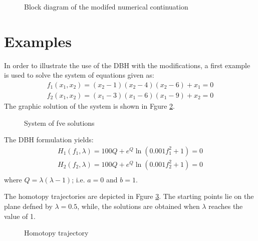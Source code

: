 \documentclass[conference]{IEEEtran}
\begin{document}
\begin{figure}[hbtp]
\centerline{
\epsfxsize=48mm
}
\caption{Block diagram of the modifed numerical continuation}
\label{bloques}
\end{figure}


\section{Examples}


In order to illustrate the use of the DBH with the modifications, a
first example is used to solve the system of equations given as:
\begin{displaymath}
\begin{array}{c}
f_1(x_1,x_2)=(x_2-1)(x_2-4)(x_2-6)+x_1=0\\
f_2(x_1,x_2)=(x_1-3)(x_1-6)(x_1-9)+x_2=0
\end{array}
\end{displaymath}
The graphic solution of the system is shown in Fgure \ref{9sol}.

\begin{figure}[hbtp]
\centerline{
\epsfxsize=90mm
}
\caption{System of fve solutions}
\label{9sol}
\end{figure}

The DBH formulation yields:
\begin{displaymath}
\begin{array}{c}
H_1(f_1,\lambda)=100Q+e^{Q}\ln(0.001f_1^2+1)=0\\
H_2(f_2,\lambda)=100Q+e^{Q}\ln(0.001f_2^2+1)=0\\
\end{array}
\end{displaymath}
where $Q=\lambda(\lambda-1)$; i.e. $a=0$ and $b=1$.



The homotopy trajectories  are depicted
in Fgure \ref{homote}. The starting points lie on the plane defned by $\lambda=0.5$, while,
the solutions are obtained when $\lambda$ reaches the value of 1.

\begin{figure}[h]
\centerline{
\epsfxsize=90mm
}
\caption{Homotopy trajectory}
\label{homote}
\end{figure}
\end{document}
